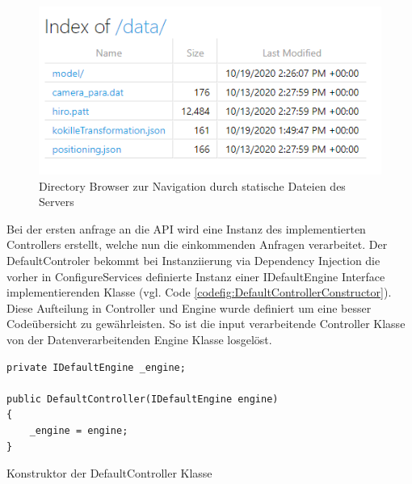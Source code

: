 \begin{figure}
	\centering
	\includegraphics[width=0.7\linewidth]{images/backend/DirectoryBrowser}
	\caption{Directory Browser zur Navigation durch statische Dateien des Servers}
	\label{fig:DirectoryBrowser}
\end{figure}

Bei der ersten anfrage an die API wird eine Instanz des implementierten Controllers erstellt, welche nun die einkommenden Anfragen verarbeitet. Der DefaultControler bekommt bei Instanziierung via Dependency Injection die vorher in ConfigureServices definierte Instanz einer IDefaultEngine Interface implementierenden Klasse (vgl. Code \ref{codefig:DefaultControllerConstructor}). Diese Aufteilung in Controller und Engine wurde definiert um eine besser Codeübersicht zu gewährleisten. So ist die input verarbeitende Controller Klasse von der Datenverarbeitenden Engine Klasse losgelöst.

\begin{codefig}
	\centering
	\lstset{style=sharpc}
	\begin{lstlisting}
private IDefaultEngine _engine;

public DefaultController(IDefaultEngine engine)
{
	_engine = engine;
}
	\end{lstlisting}
	\caption{Konstruktor der DefaultController Klasse}
	\label{codefig:DefaultControllerConstructor}
\end{codefig}

